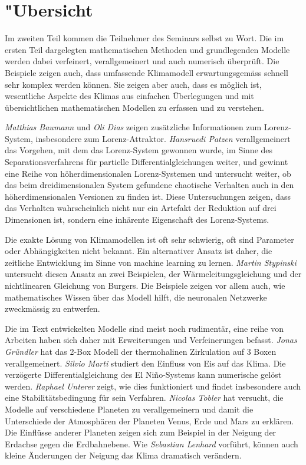 %
%
%
\chapter*{"Ubersicht}
\rhead{}
\label{skript:uebersicht}
Im zweiten Teil kommen die Teilnehmer des Seminars selbst zu Wort.
Die im ersten Teil dargelegten mathematischen Methoden und
grundlegenden Modelle werden dabei verfeinert, verallgemeinert
und auch numerisch überprüft.
Die Beispiele zeigen auch, dass umfassende Klimamodell erwartungsgemäss
schnell sehr komplex werden können.
Sie zeigen aber auch, dass es möglich ist, wesentliche Aspekte
des Klimas aus einfachen Überlegungen und mit übersichtlichen
mathematischen Modellen zu erfassen und zu verstehen.

{\em Matthias Baumann} und {\em Oli Dias} zeigen zusätzliche
Informationen zum Lorenz-System, insbesondere zum Lorenz-Attraktor.
{\em Hansruedi Patzen} verallgemeinert das Vorgehen, mit dem das
Lorenz-System gewonnen wurde, im Sinne des Separationsverfahrens
für partielle Differentialgleichungen weiter, und gewinnt eine
Reihe von höherdimensionalen Lorenz-Systemen und untersucht weiter,
ob das beim dreidimensionalen System gefundene chaotische Verhalten 
auch in den höherdimensionalen Versionen zu finden ist.
Diese Untersuchungen zeigen, dass das Verhalten wahrscheinlich
nicht nur ein Artefakt der Reduktion auf drei Dimensionen ist, sondern
eine inhärente Eigenschaft des Lorenz-Systems.

Die exakte Lösung von Klimamodellen ist oft sehr schwierig, oft sind
Parameter oder Abhängigkeiten nicht bekannt.
Ein alternativer Ansatz ist daher, die zeitliche Entwicklung
im Sinne von machine learning zu lernen.
{\em Martin Stypinski} untersucht diesen Ansatz an zwei Beispielen,
der Wärmeleitungsgleichung und der nichtlinearen Gleichung von Burgers.
Die Beispiele zeigen vor allem auch, wie mathematisches Wissen über das
Modell hilft, die neuronalen Netzwerke zweckmässig zu entwerfen.

Die im Text entwickelten Modelle sind meist noch rudimentär, eine
reihe von Arbeiten haben sich daher mit Erweiterungen und Verfeinerungen
befasst.
{\em Jonas Gründler} hat das 2-Box Modell der thermohalinen Zirkulation
auf 3 Boxen verallgemeinert.
{\em Silvio Marti} studiert den Einfluss von Eis auf das Klima.
Die verzögerte Differentialgleichung des El Niño-Systems kann
numerische gelöst werden. {\em Raphael Unterer} zeigt, wie dies
funktioniert und findet insbesondere auch eine Stabilitätsbedingung
für sein Verfahren.
{\em Nicolas Tobler} hat versucht, die Modelle auf verschiedene
Planeten zu verallgemeinern und damit die Unterschiede der Atmosphären
der Planeten Venus, Erde und Mars zu erklären.
Die Einflüsse anderer Planeten zeigen sich zum Beispiel in der
Neigung der Erdachse gegen die Erdbahnebene.
Wie {\em Sebastian Lenhard} vorführt, können auch kleine Änderungen
der Neigung das Klima dramatisch verändern.

